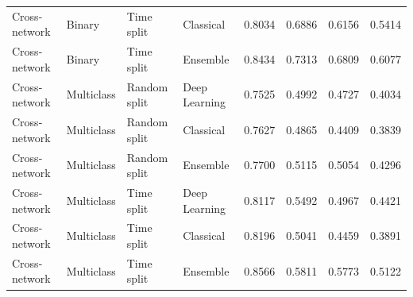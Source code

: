 \begin{table}
\begin{tabular}{llllrrrr}
Cross-network & Binary & Time split & Classical & 0.8034 & 0.6886 & 0.6156 & 0.5414 \\
Cross-network & Binary & Time split & Ensemble & 0.8434 & 0.7313 & 0.6809 & 0.6077 \\
Cross-network & Multiclass & Random split & Deep Learning & 0.7525 & 0.4992 & 0.4727 & 0.4034 \\
Cross-network & Multiclass & Random split & Classical & 0.7627 & 0.4865 & 0.4409 & 0.3839 \\
Cross-network & Multiclass & Random split & Ensemble & 0.7700 & 0.5115 & 0.5054 & 0.4296 \\
Cross-network & Multiclass & Time split & Deep Learning & 0.8117 & 0.5492 & 0.4967 & 0.4421 \\
Cross-network & Multiclass & Time split & Classical & 0.8196 & 0.5041 & 0.4459 & 0.3891 \\
Cross-network & Multiclass & Time split & Ensemble & 0.8566 & 0.5811 & 0.5773 & 0.5122 \\
\bottomrule
\end{tabular}
\end{table}
